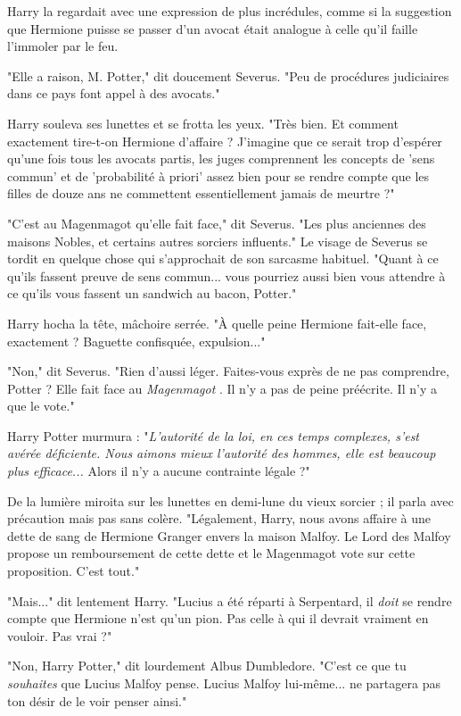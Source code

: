 Harry la regardait avec une expression de plus incrédules, comme si la suggestion que Hermione puisse se passer d'un avocat était analogue à celle qu'il faille l'immoler par le feu.

"Elle a raison, M. Potter," dit doucement Severus. "Peu de procédures judiciaires dans ce pays font appel à des avocats."

Harry souleva ses lunettes et se frotta les yeux. "Très bien. Et comment exactement tire-t-on Hermione d'affaire ? J'imagine que ce serait trop d'espérer qu'une fois tous les avocats partis, les juges comprennent les concepts de 'sens commun' et de 'probabilité à priori' assez bien pour se rendre compte que les filles de douze ans ne commettent essentiellement jamais de meurtre ?"

"C'est au Magenmagot qu'elle fait face," dit Severus. "Les plus anciennes des maisons Nobles, et certains autres sorciers influents." Le visage de Severus se tordit en quelque chose qui s'approchait de son sarcasme habituel. "Quant à ce qu'ils fassent preuve de sens commun... vous pourriez aussi bien vous attendre à ce qu'ils vous fassent un sandwich au bacon, Potter."

Harry hocha la tête, mâchoire serrée. "À quelle peine Hermione fait-elle face, exactement ? Baguette confisquée, expulsion..."

"Non," dit Severus. "Rien d'aussi léger. Faites-vous exprès de ne pas comprendre, Potter ? Elle fait face au \emph{Magenmagot} . Il n'y a pas de peine préécrite. Il n'y a que le vote."

Harry Potter murmura : "\emph{L'autorité de la loi, en ces temps complexes, s'est avérée déficiente. Nous aimons mieux l'autorité des hommes, elle est beaucoup plus efficace...}  Alors il n'y a aucune contrainte légale ?"

De la lumière miroita sur les lunettes en demi-lune du vieux sorcier ; il parla avec précaution mais pas sans colère. "Légalement, Harry, nous avons affaire à une dette de sang de Hermione Granger envers la maison Malfoy. Le Lord des Malfoy propose un remboursement de cette dette et le Magenmagot vote sur cette proposition. C'est tout."

"Mais..." dit lentement Harry. "Lucius a été réparti à Serpentard, il \emph{doit}  se rendre compte que Hermione n'est qu'un pion. Pas celle à qui il devrait vraiment en vouloir. Pas vrai ?"

"Non, Harry Potter," dit lourdement Albus Dumbledore. "C'est ce que tu \emph{souhaites}  que Lucius Malfoy pense. Lucius Malfoy lui-même... ne partagera pas ton désir de le voir penser ainsi."

